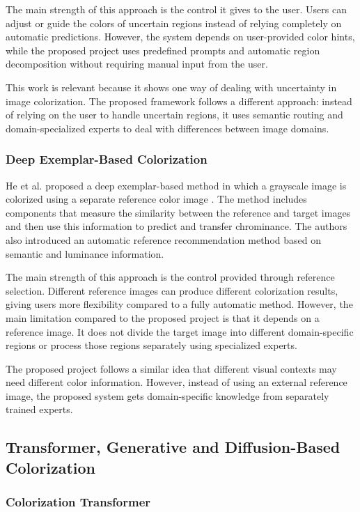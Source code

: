 \documentclass{FastFyp}
\begin{document}
The main strength of this approach is the control it gives to the user. Users can adjust or guide the colors of uncertain regions instead of relying completely on automatic predictions. However, the system depends on user-provided color hints, while the proposed project uses predefined prompts and automatic region decomposition without requiring manual input from the user.

This work is relevant because it shows one way of dealing with uncertainty in image colorization. The proposed framework follows a different approach: instead of relying on the user to handle uncertain regions, it uses semantic routing and domain-specialized experts to deal with differences between image domains.

\subsubsection{Deep Exemplar-Based Colorization}

He et al. proposed a deep exemplar-based method in which a grayscale image is colorized using a separate reference color image \cite{ref4}. The method includes components that measure the similarity between the reference and target images and then use this information to predict and transfer chrominance. The authors also introduced an automatic reference recommendation method based on semantic and luminance information.

The main strength of this approach is the control provided through reference selection. Different reference images can produce different colorization results, giving users more flexibility compared to a fully automatic method. However, the main limitation compared to the proposed project is that it depends on a reference image. It does not divide the target image into different domain-specific regions or process those regions separately using specialized experts.

The proposed project follows a similar idea that different visual contexts may need different color information. However, instead of using an external reference image, the proposed system gets domain-specific knowledge from separately trained experts.

\subsection{Transformer, Generative and Diffusion-Based Colorization}

\subsubsection{Colorization Transformer}
\end{document}
